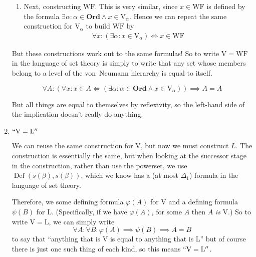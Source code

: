 \documentclass[11pt,letterpaper]{article}
\newcommand{\parens}[1]{\left(#1\right)}
\newcommand{\V}{\mathrm{V}}
\newcommand{\WF}{\mathrm{WF}}
\renewcommand{\L}{\mathrm{L}}
\newcommand{\Ord}{\mathbf{Ord}}
\DeclareMathOperator{\DefOp}{Def}
\newcommand{\Def}[1]{\DefOp{\parens{#1}}}
\renewcommand{\phi}{\varphi}
\begin{document}
\begin{enumerate}
\begin{enumerate}
            \item Next, constructing $\WF$. This is very similar, since
                $x \in \WF$ is defined by the formula
                $\exists \alpha : \alpha \in \Ord \land x \in \V_\alpha$. Hence
                we can repeat the same construction for $\V_\alpha$ to build
                $\WF$ by
                \begin{align*}
                    \forall x :
                    (\exists \alpha : x \in \V_\alpha)
                    \iff
                    x \in \WF
                \end{align*}

        \end{enumerate}

        But these constructions work out to the same formulas! So to write
        $\V = \WF$ in the language of set theory is simply to write that any
        set whose members belong to a level of the von~Neumann hierarchy is
        equal to itself.

        \begin{equation*}
            \forall A :
            \parens{
                \forall x : x \in A
                \iff
                \parens{
                    \exists \alpha :
                    \alpha \in \Ord
                    \land
                    x \in \V_\alpha
                }
            }
            \implies
            A = A
        \end{equation*}

        But all things are equal to themselves by reflexivity, so the left-hand
        side of the implication doesn't really do anything.

    \item $``\V = \L''$

        We can reuse the same construction for $\V$, but now we must construct
        $L$. The construction is essentially the same, but when looking at the
        successor stage in the construction, rather than use the powerset, we
        use $\Def{s(\beta), s(\beta)}$, which we know has a (at most
        $\Delta_1$) formula in the language of set theory.

        Therefore, we some defining formula $\phi(A)$ for $\V$ and a defining
        formula $\psi(B)$ for $\L$. (Specifically, if we have $\phi(A)$, for
        some $A$ then $A$ \emph{is} $\V$.) So to write $\V = \L$, we can simply
        write
        \begin{equation*}
            \forall A :
            \forall B :
            \phi(A)
            \implies
            \psi(B)
            \implies
            A = B
        \end{equation*}
        to say that ``anything that is $\V$ is equal to anything that is $\L$''
        but of course there is just one such thing of each kind, so this means
        $``\V = \L''$.

\end{enumerate}
\end{document}
